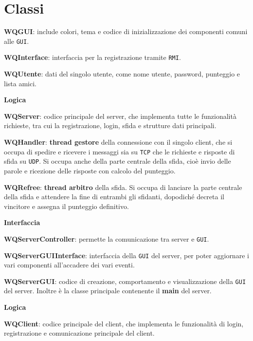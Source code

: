 \documentclass[10pt]{article}
\begin{document}
{\section{Classi}
\begin{list}{}{Classi comuni ai due componenti}
	\item \textbf{WQGUI}: include colori, tema e codice di inizializzazione dei componenti comuni alle \texttt{GUI}.
	\item \textbf{WQInterface}: interfaccia per la registrazione tramite \texttt{RMI}.
	\item \textbf{WQUtente}: dati del singolo utente, come nome utente, password, punteggio e lista amici.
\end{list}
\begin{list}{}{\textbf{Server}}
	\item \textbf{Logica}
	\item \textbf{WQServer}: codice principale del server, che implementa tutte le funzionalità richieste, tra cui la registrazione, login, sfida e strutture dati principali.
	\item \textbf{WQHandler}: \textbf{thread gestore} della connessione con il singolo client, che si occupa di spedire e ricevere i messaggi sia su \texttt{TCP} che le richieste e risposte di sfida su \texttt{UDP}. Si occupa anche della parte centrale della sfida, cioè invio delle parole e ricezione delle risposte con calcolo del punteggio.
	\item \textbf{WQRefree}: \textbf{thread arbitro} della sfida. Si occupa di lanciare la parte centrale della sfida e attendere la fine di entrambi gli sfidanti, dopodiché decreta il vincitore e assegna il punteggio definitivo.
	\item \textbf{Interfaccia}
	\item \textbf{WQServerController}: permette la comunicazione tra server e \texttt{GUI}.
	\item \textbf{WQServerGUIInterface}: interfaccia della \texttt{GUI} del server, per poter aggiornare i vari componenti all'accadere dei vari eventi.
	\item \textbf{WQServerGUI}: codice di creazione, comportamento e visualizzazione della \texttt{GUI} del server. Inoltre è la classe principale contenente il \textbf{main} del server.
\end{list}
\begin{list}{}{\textbf{Client}}
	\item \textbf{Logica}
	\item \textbf{WQClient}: codice principale del client, che implementa le funzionalità di login, registrazione e comunicazione principale del client.

\end{list}}
\end{document}
